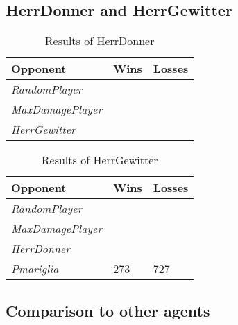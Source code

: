 \subsection{HerrDonner and HerrGewitter}
\begin{table}[h]
    \centering
    \begin{tabular}{|l|l|l|}
    \hline 
    \textbf{Opponent}      & Wins & Losses \\
    \hline 
    \emph{RandomPlayer}    &      &        \\
    \hline 
    \emph{MaxDamagePlayer} &      &        \\
    \hline 
    \emph{HerrGewitter}    &      &        \\
    \hline 
    \end{tabular}
    \caption{Results of HerrDonner}
    \label{tab:HerrDonner}
\end{table}
\begin{table}[h]
    \centering
    \begin{tabular}{|l|l|l|}
    \hline 
    \textbf{Opponent}      & Wins & Losses \\
    \hline 
    \emph{RandomPlayer}    &      &        \\
    \hline 
    \emph{MaxDamagePlayer} &      &        \\
    \hline 
    \emph{HerrDonner}    &      &        \\
    \hline 
    \emph{Pmariglia}        & 273   & 727 \\
    \hline
    \end{tabular}
    \caption{Results of HerrGewitter}
    \label{tab:HerrGewitter}
\end{table}

\subsection{Comparison to other agents}
 